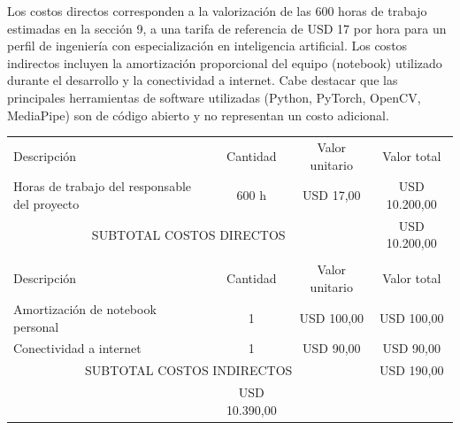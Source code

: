 \documentclass[
11pt, %
]{charter}
\begin{document}
	Los costos directos corresponden a la valorización de las 600 horas de trabajo estimadas en la sección 9, a una tarifa de referencia de USD 17 por hora para un perfil de ingeniería con especialización en inteligencia artificial. Los costos indirectos incluyen la amortización proporcional del equipo (notebook) utilizado durante el desarrollo y la conectividad a internet. Cabe destacar que las principales herramientas de software utilizadas (Python, PyTorch, OpenCV, MediaPipe) son de código abierto y no representan un costo adicional.
	
	\begin{table}[htpb]
		\centering
		\begin{tabularx}{\linewidth}{@{}|X|c|r|r|@{}}
			\hline
			\rowcolor[HTML]{C0C0C0} 
			\multicolumn{4}{|c|}{\cellcolor[HTML]{C0C0C0}COSTOS DIRECTOS} \\ \hline
			\rowcolor[HTML]{C0C0C0} 
			Descripción &
			\multicolumn{1}{c|}{\cellcolor[HTML]{C0C0C0}Cantidad} &
			\multicolumn{1}{c|}{\cellcolor[HTML]{C0C0C0}Valor unitario} &
			\multicolumn{1}{c|}{\cellcolor[HTML]{C0C0C0}Valor total} \\ \hline
			Horas de trabajo del responsable del proyecto &
			\multicolumn{1}{c|}{600 h} &
			\multicolumn{1}{c|}{USD 17,00} &
			\multicolumn{1}{c|}{USD 10.200,00} \\ \hline
			\multicolumn{3}{|c|}{SUBTOTAL COSTOS DIRECTOS} &
			\multicolumn{1}{c|}{USD 10.200,00} \\ \hline
			\rowcolor[HTML]{C0C0C0} 
			\multicolumn{4}{|c|}{\cellcolor[HTML]{C0C0C0}COSTOS INDIRECTOS} \\ \hline
			\rowcolor[HTML]{C0C0C0} 
			Descripción &
			\multicolumn{1}{c|}{\cellcolor[HTML]{C0C0C0}Cantidad} &
			\multicolumn{1}{c|}{\cellcolor[HTML]{C0C0C0}Valor unitario} &
			\multicolumn{1}{c|}{\cellcolor[HTML]{C0C0C0}Valor total} \\ \hline
			Amortización de notebook personal &
			\multicolumn{1}{c|}{1} &
			\multicolumn{1}{c|}{USD 100,00} &
			\multicolumn{1}{c|}{USD 100,00} \\ \hline
			Conectividad a internet &
			\multicolumn{1}{c|}{1} &
			\multicolumn{1}{c|}{USD 90,00} &
			\multicolumn{1}{c|}{USD 90,00} \\ \hline
			\multicolumn{3}{|c|}{SUBTOTAL COSTOS INDIRECTOS} &
			\multicolumn{1}{c|}{USD 190,00} \\ \hline
			\rowcolor[HTML]{C0C0C0}
			\multicolumn{3}{|c|}{TOTAL} &
			USD 10.390,00 \\ \hline
		\end{tabularx}%
	\end{table}
	
\end{document}
